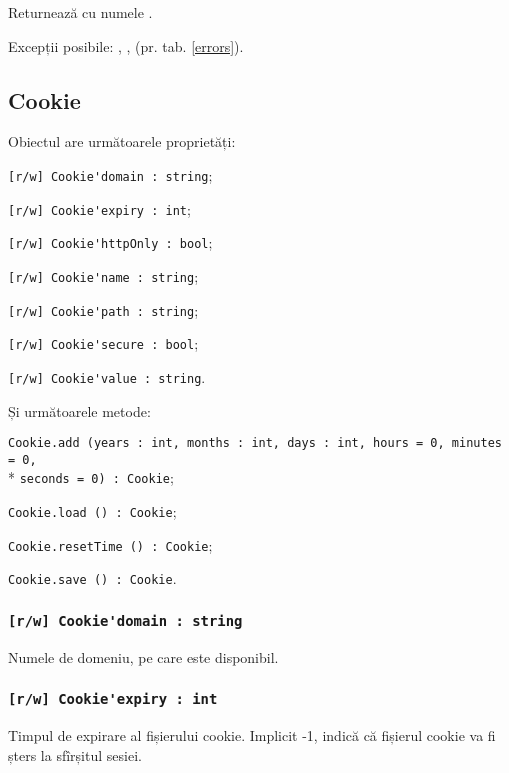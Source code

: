 Returnează \cookie{} cu numele .

Excepții posibile: , ,  (pr. tab. \ref{errors}).

\subsection{{\color{orange} Cookie}}

Obiectul \cookie{} are următoarele proprietăți:
\begin{icItems}
	\item \lstinline|[r/w] Cookie'domain : string|;
	\item \lstinline|[r/w] Cookie'expiry : int|;
	\item \lstinline|[r/w] Cookie'httpOnly : bool|;
	\item \lstinline|[r/w] Cookie'name : string|;
	\item \lstinline|[r/w] Cookie'path : string|;
	\item \lstinline|[r/w] Cookie'secure : bool|;
	\item \lstinline|[r/w] Cookie'value : string|.
\end{icItems}

Și următoarele metode:
\begin{icItems}
	\item \lstinline|Cookie.add (years : int, months : int, days : int, hours = 0, minutes = 0,|\\* \lstinline|seconds = 0) : Cookie|;
	\item \lstinline|Cookie.load () : Cookie|;
	\item \lstinline|Cookie.resetTime () : Cookie|;
	\item \lstinline|Cookie.save () : Cookie|.
\end{icItems}

\subsubsection{\lstinline|[r/w] Cookie'domain : string|}

Numele de domeniu, pe care \cookie{} este disponibil.

\subsubsection{\lstinline|[r/w] Cookie'expiry : int|}

Timpul de expirare al fișierului cookie. Implicit -1, indică că fișierul cookie va fi șters la sfîrșitul sesiei.

